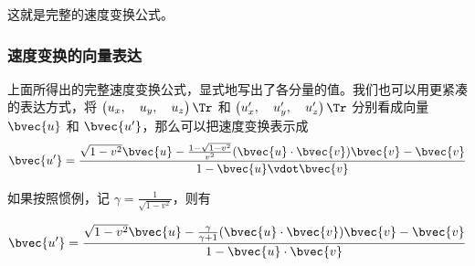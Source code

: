 这就是完整的速度变换公式。

\subsubsection{速度变换的向量表达}

上面所得出的完整速度变换公式，显式地写出了各分量的值。我们也可以用更紧凑的表达方式，将 $\left(\begin{matrix}u_x,\quad u_y,\quad u_z\end{matrix} \right)\Tr $ 和 $\left(\begin{matrix}u_x',\quad u_y',\quad u_z'\end{matrix} \right)\Tr$ 分别看成向量 $\bvec{u}$ 和 $\bvec{u'}$，那么可以把速度变换表示成
\begin{equation}\label{eq_RelVel_5}
\bvec{u'}=\frac{\sqrt{1-v^2}\bvec{u}-\frac{1-\sqrt{1-v^2}}{v^2}(\bvec{u}\cdot\bvec{v})\bvec{v}-\bvec{v}}{1-\bvec{u}\vdot\bvec{v}}
\end{equation}

如果按照惯例，记 $\gamma=\frac{1}{\sqrt{1-v^2}}$，则有

\begin{equation}
\bvec{u'}=\frac{\sqrt{1-v^2}\bvec{u}-\frac{\gamma}{\gamma+1}(\bvec{u}\cdot\bvec{v})\bvec{v}-\bvec{v}}{1-\bvec{u}\cdot\bvec{v}}
\end{equation}




